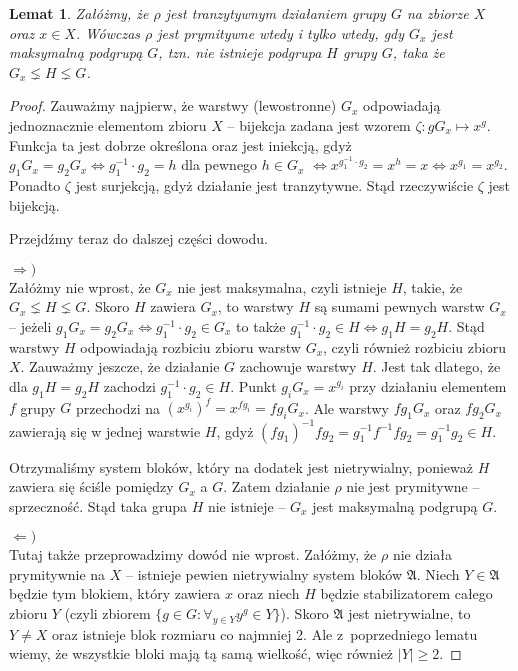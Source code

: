 \documentclass[licencjacka]{pracamgr}
\newtheorem{lemma}{Lemat}[section]
\begin{document}
\begin{lemma}\label{max_group}
    Załóżmy, że $\rho$ jest tranzytywnym działaniem grupy $G$ na zbiorze $X$ oraz $x \in X$.
    Wówczas $\rho$ jest prymitywne wtedy i tylko wtedy, gdy $G_x$ jest maksymalną podgrupą $G$, tzn.
    nie istnieje podgrupa $H$ grupy $G$, taka że $G_x \lneq H \lneq G$.
\end{lemma}
\begin{proof}
Zauważmy najpierw, że warstwy (lewostronne) $G_x$ odpowiadają
jednoznacznie elementom zbioru $X$ -- bijekcja zadana jest wzorem
$\zeta \colon g G_x \mapsto x^g$. Funkcja ta jest dobrze określona
oraz jest iniekcją, gdyż $g_1 G_x = g_2 G_x \iff g_1^{-1} \cdot g_2
= h$ dla pewnego $h \in G_x$ $\iff x^{g_1^{-1} \cdot g_2} = x^h = x
\iff x^{g_1} = x^{g_2}$. Ponadto $\zeta$ jest surjekcją, gdyż
działanie jest tranzytywne. Stąd rzeczywiście $\zeta$ jest bijekcją.

Przejdźmy teraz do dalszej części dowodu.

$\Rightarrow)$ \\
Załóżmy nie wprost, że $G_x$ nie jest maksymalna, czyli istnieje
$H$, takie, że $G_x \lneq H \lneq G$. Skoro $H$ zawiera $G_x$, to
warstwy $H$ są sumami pewnych warstw $G_x$ -- jeżeli $g_1 G_x = g_2
G_x \iff g_1^{-1} \cdot g_2 \in G_x$ to także $g_1^{-1} \cdot g_2
\in H \iff g_1 H = g_2 H$. Stąd warstwy $H$ odpowiadają rozbiciu
zbioru warstw $G_x$, czyli również rozbiciu zbioru $X$. Zauważmy
jeszcze, że działanie $G$ zachowuje warstwy $H$. Jest tak dlatego,
że dla $g_1 H = g_2 H$ zachodzi $g_1^{-1} \cdot g_2 \in H$. Punkt
$g_i G_x = x^{g_i}$ przy działaniu elementem $f$ grupy $G$
przechodzi na $(x^{g_i})^f = x^{f g_i} = f g_i G_x$. Ale warstwy $f
g_1 G_x$ oraz $f g_2 G_x$ zawierają się w jednej warstwie $H$, gdyż
$(f g_1)^{-1} f g_2 = g_1^{-1} f^{-1} f g_2 = g_1^{-1} g_2 \in H$.

Otrzymaliśmy system bloków, który na dodatek jest
nietrywialny, ponieważ $H$ zawiera się ściśle pomiędzy $G_x$ a $G$.
Zatem działanie $\rho$ nie jest prymitywne -- sprzeczność. Stąd taka
grupa $H$ nie istnieje -- $G_x$ jest maksymalną podgrupą $G$.

$\Leftarrow)$ \\
Tutaj także przeprowadzimy dowód nie wprost. Załóżmy, że $\rho$
nie działa prymitywnie na $X$ -- istnieje pewien nietrywialny
system bloków $\mathfrak{A}$. Niech $Y \in \mathfrak{A}$ będzie tym blokiem, który
zawiera $x$ oraz niech $H$ będzie stabilizatorem całego zbioru $Y$
(czyli zbiorem $\{g \in G \colon \forall_{y \in Y} y^g \in Y \}$).
Skoro $\mathfrak{A}$ jest nietrywialne, to $Y \ne X$ oraz istnieje
blok rozmiaru co najmniej 2. Ale z~poprzedniego lematu wiemy, że
wszystkie bloki mają tą samą wielkość, więc również $|Y| \ge 2$.


\end{proof}
\end{document}
